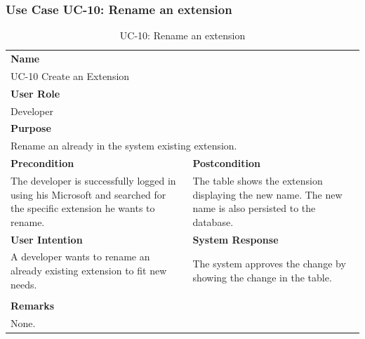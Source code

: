 \subsubsection{Use Case UC-10: Rename an extension}\label{subsubsec:use-case-uc-10:-rename-an-extension}

\begin{table}[H]
    \centering
    \begin{tabular}{|p{}|p{}|}

        \hline
        \multicolumn{2}{|l|}{\rowcolor{gray!50}\textbf{Name}} \\
        \multicolumn{2}{|l|}{UC-10 Create an Extension} \\ \hline

        \multicolumn{2}{|l|}{\rowcolor{gray!50}\textbf{User Role}} \\
        \multicolumn{2}{|l|}{Developer} \\ \hline

        \multicolumn{2}{|l|}{\rowcolor{gray!50}\textbf{Purpose}} \\
        \multicolumn{2}{|p{1\textwidth}|}{Rename an already in the system existing extension.} \\ \hline

        \rowcolor{gray!50}\textbf{Precondition} & \rowcolor{gray!50}\textbf{Postcondition} \\
        The developer is successfully logged in using his Microsoft and searched for the specific extension he wants to rename.
        &
        The table shows the extension displaying the new name.
        The new name is also persisted to the database.\\ \hline

        \rowcolor{gray!50}\textbf{User Intention} & \rowcolor{gray!50}\textbf{System Response} \\
        A developer wants to rename an already existing extension to fit new needs.
        &
        The system approves the change by showing the change in the table. \\ \hline

        & \\ \hline

        \multicolumn{2}{|l|}{\rowcolor{gray!50}\textbf{Remarks}} \\
        \multicolumn{2}{|p{1\textwidth}|}{None.} \\ \hline
    \end{tabular}
    \caption{UC-10: Rename an extension}
    \label{tab:uc-rename-extension}
\end{table}

